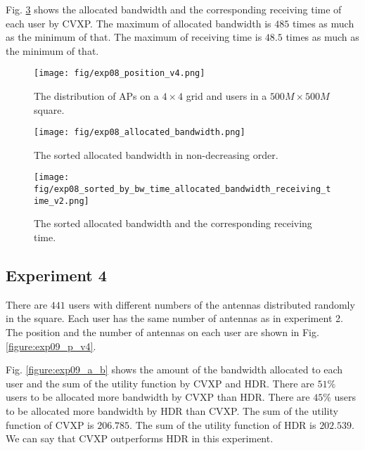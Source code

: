 	Fig. \ref{figure:exp08_s_b_b_t_a_b_r_t_v2} shows the allocated bandwidth and the corresponding receiving time of each user by CVXP. The maximum of allocated bandwidth is $485$ times as much as the minimum of that. The maximum of receiving time is $48.5$ times as much as the minimum of that.
					
		\begin{figure}
			\begin{center}
				\texttt{[image: fig/exp08\_position\_v4.png]}
				\caption{The distribution of APs on a $4 \times 4$ grid and users in a $500M \times 500M$ square.}
				\label{figure:exp08_p_v4}
			\end{center}
		\end{figure}

		\begin{figure}
			\begin{center}
				\texttt{[image: fig/exp08\_allocated\_bandwidth.png]}
				\caption{The sorted allocated bandwidth in non-decreasing order.}
				\label{figure:exp08_a_b}
			\end{center}
		\end{figure}

		\begin{figure}
			\begin{center}
				\texttt{[image: fig/exp08\_sorted\_by\_bw\_time\_allocated\_bandwidth\_receiving\_time\_v2.png]}
				\caption{The sorted allocated bandwidth and the corresponding receiving time.}
				\label{figure:exp08_s_b_b_t_a_b_r_t_v2}
			\end{center}
		\end{figure}	

\subsection{Experiment 4}
There are $441$ users with different numbers of the antennas distributed randomly in the square. Each user has the same number of antennas as in experiment 2. The position and the number of antennas on each user are shown in Fig. \ref{figure:exp09_p_v4}.

Fig. \ref{figure:exp09_a_b} shows the amount of the bandwidth allocated to each user and the sum of the utility function by CVXP and HDR. There are $51\%$ users to be allocated more bandwidth by CVXP than HDR. There are $45\%$ users to be allocated more bandwidth by HDR than CVXP. The sum of the utility function of CVXP is $206.785$. The sum of the utility function of HDR is $202.539$. We can say that CVXP outperforms HDR in this experiment.

